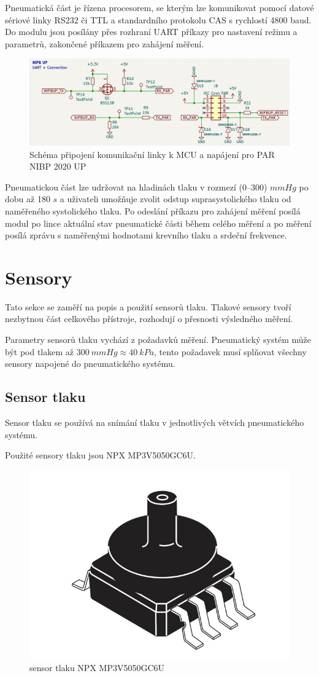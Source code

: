 Pneumatická část je řízena procesorem, se kterým lze komunikovat pomocí datové sériové linky RS232 či TTL a standardního protokolu CAS s rychlostí 4800 baud. Do modulu jsou posílány přes rozhraní UART příkazy pro nastavení režimu a parametrů, zakončené příkazem pro zahájení měření.
\begin{figure}[H]
    \centering
    \includegraphics[width=0.9\linewidth]{pictures/nibpup_connection.jpg}
    \caption{Schéma připojení komunikační linky k MCU a napájení pro PAR NIBP 2020 UP }
    \label{fig:par_modul_comm}
\end{figure}
Pneumatickou část lze udržovat na hladinách tlaku v rozmezí (0–300) $mmHg$ po dobu až 180 $s$ a uživateli umožňuje zvolit odstup suprasystolického tlaku od naměřeného systolického tlaku. Po odeslání příkazu pro zahájení měření posílá modul po lince aktuální stav pneumatické části během celého měření a po měření posílá zprávu s naměřenými hodnotami krevního tlaku a srdeční frekvence.
\section{Sensory}
Tato sekce se zaměří na popis a použití sensorů tlaku. Tlakové sensory tvoří nezbytnou část celkového přístroje, rozhodují o přesnosti výsledného měření. \par
Parametry sensorů tlaku vychází z požadavků měření. Pneumatický systém může být pod tlakem až $300 \ mmHg \approx 40 \ kPa$, tento požadavek musí splňovat všechny sensory napojené do pneumatického systému.

\subsection{Sensor tlaku} \label{section:pressure_sen}
Sensor tlaku se používá na snímání tlaku v jednotlivých větvích pneumatického systému. \par

Použité sensory tlaku jsou NPX MP3V5050GC6U.

\begin{figure}[H]
    \centering
    \includegraphics[width=0.5\linewidth]{pictures/nxp_sensor.jpg}
    \caption{sensor tlaku NPX MP3V5050GC6U \cite{cite:NXP}}
    \label{fig:nxp}
\end{figure}


